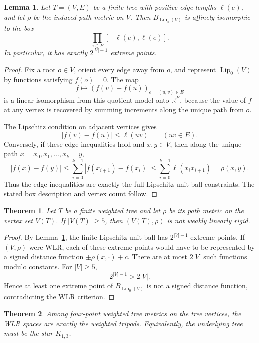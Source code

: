 \documentclass[11pt]{article}
\newtheorem{theorem}{Theorem}
\newtheorem{lemma}{Lemma}
\theoremstyle{remark}
\begin{document}
\begin{lemma}\label{lem:box}
Let \(T=(V,E)\) be a finite tree with positive edge lengths \(\ell(e)\), and
let \(\rho\) be the induced path metric on \(V\).  Then
\(B_{\operatorname{Lip}_0(V)}\) is affinely isomorphic to the box
\[
  \prod_{e\in E}[-\ell(e),\ell(e)].
\]
In particular, it has exactly \(2^{|V|-1}\) extreme points.
\end{lemma}

\begin{proof}
Fix a root \(o\in V\), orient every edge away from \(o\), and represent
\(\operatorname{Lip}_0(V)\) by functions satisfying \(f(o)=0\).  The map
\[
  f\longmapsto (f(v)-f(u))_{e=(u,v)\in E}
\]
is a linear isomorphism from this quotient model onto \(\mathbb R^E\), because
the value of \(f\) at any vertex is recovered by summing increments along the
unique path from \(o\).

The Lipschitz condition on adjacent vertices gives
\[
  |f(v)-f(u)|\le \ell(uv)\qquad (uv\in E).
\]
Conversely, if these edge inequalities hold and \(x,y\in V\), then along the
unique path \(x=x_0,x_1,\ldots,x_k=y\),
\[
  |f(x)-f(y)|
  \le \sum_{i=0}^{k-1}|f(x_{i+1})-f(x_i)|
  \le \sum_{i=0}^{k-1}\ell(x_i x_{i+1})
  = \rho(x,y).
\]
Thus the edge inequalities are exactly the full Lipschitz unit-ball
constraints.  The stated box description and vertex count follow.
\end{proof}

\begin{theorem}\label{thm:tree}
Let \(T\) be a finite weighted tree and let \(\rho\) be its path metric on the
vertex set \(V(T)\).  If \(|V(T)|\ge5\), then \((V(T),\rho)\) is not weakly
linearly rigid.
\end{theorem}

\begin{proof}
By Lemma~\ref{lem:box}, the finite Lipschitz unit ball has
\(2^{|V|-1}\) extreme points.  If \((V,\rho)\) were WLR, each of these extreme
points would have to be represented by a signed distance function
\(\pm\rho(x,\cdot)+c\).  There are at most \(2|V|\) such functions modulo
constants.  For \(|V|\ge5\),
\[
  2^{|V|-1} > 2|V|.
\]
Hence at least one extreme point of \(B_{\operatorname{Lip}_0(V)}\) is not a
signed distance function, contradicting the WLR criterion.
\end{proof}

\begin{theorem}\label{thm:four}
Among four-point weighted tree metrics on the tree vertices, the WLR spaces
are exactly the weighted tripods.  Equivalently, the underlying tree must be
the star \(K_{1,3}\).
\end{theorem}
\end{document}
